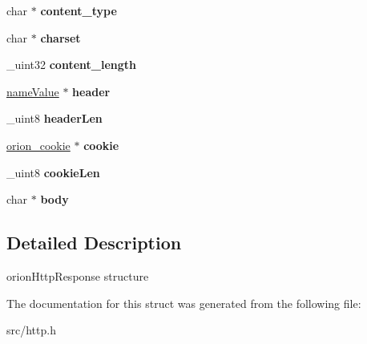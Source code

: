 \begin{DoxyCompactItemize}
\item 
\hypertarget{structorion__httpResponse_a734f987d6f2823800d0b6a2a9bb2d26a}{
char $\ast$ {\bfseries content\_\-type}}
\label{structorion__httpResponse_a734f987d6f2823800d0b6a2a9bb2d26a}

\item 
\hypertarget{structorion__httpResponse_a53126c4ea065b647fe1115ef35d7028d}{
char $\ast$ {\bfseries charset}}
\label{structorion__httpResponse_a53126c4ea065b647fe1115ef35d7028d}

\item 
\hypertarget{structorion__httpResponse_a2b8ff190c94e8e1b5e61d4905b21a28c}{
\_\-uint32 {\bfseries content\_\-length}}
\label{structorion__httpResponse_a2b8ff190c94e8e1b5e61d4905b21a28c}

\item 
\hypertarget{structorion__httpResponse_a45c1160f05035286bc499eddda03be68}{
\hyperlink{structnameValue}{nameValue} $\ast$ {\bfseries header}}
\label{structorion__httpResponse_a45c1160f05035286bc499eddda03be68}

\item 
\hypertarget{structorion__httpResponse_a5c760fb95aca110d0561fac710de3509}{
\_\-uint8 {\bfseries headerLen}}
\label{structorion__httpResponse_a5c760fb95aca110d0561fac710de3509}

\item 
\hypertarget{structorion__httpResponse_ae687f288a074e0fa0e6f9ca6e44991e1}{
\hyperlink{structorion__cookie}{orion\_\-cookie} $\ast$ {\bfseries cookie}}
\label{structorion__httpResponse_ae687f288a074e0fa0e6f9ca6e44991e1}

\item 
\hypertarget{structorion__httpResponse_a3ad10dbd47b57b04729706ca96a9d2fe}{
\_\-uint8 {\bfseries cookieLen}}
\label{structorion__httpResponse_a3ad10dbd47b57b04729706ca96a9d2fe}

\item 
\hypertarget{structorion__httpResponse_a8e5d8dbe1389410747dd858b7be77128}{
char $\ast$ {\bfseries body}}
\label{structorion__httpResponse_a8e5d8dbe1389410747dd858b7be77128}

\end{DoxyCompactItemize}


\subsection{Detailed Description}
orionHttpResponse structure 

The documentation for this struct was generated from the following file:\begin{DoxyCompactItemize}
\item 
src/http.h\end{DoxyCompactItemize}

